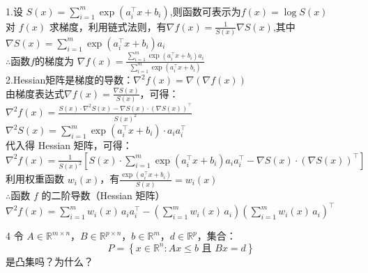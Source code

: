 \documentclass{article}
\newenvironment{problem_cn}[2][问题]{\begin{trivlist}
\item[\hskip \labelsep {\bfseries #1}\hskip \labelsep {\bfseries #2.}]}{\end{trivlist}}
\newenvironment{solution_cn}{%
  \begin{proof}[解答]%
  \kaishu  %
}{%
  \end{proof}%
}
\begin{document}
\begin{solution_cn}
\quad \\
1.设 $S(x) = \sum_{i=1}^m \exp\left(a_i^\top x + b_i\right)$,则函数可表示为$f(x) = \log S(x)$ \\
对 \( f(x) \) 求梯度，利用链式法则，有$\nabla f(x) = \frac{1}{S(x)} \nabla S(x)$,其中 $\nabla S(x) = \sum_{i=1}^m \exp\left(a_i^\top x + b_i\right) a_i $ \\
$\therefore$函数\( f \)的梯度为 $\nabla f(x) = \frac{\sum_{i=1}^m \exp\left(a_i^\top x + b_i\right) a_i}{\sum_{i=1}^m \exp\left(a_i^\top x + b_i\right)}$ \\
2.Hessian矩阵是梯度的导数：$\nabla^2 f(x) = \nabla \left( \nabla f(x) \right)$\\
由梯度表达式$\nabla f(x) = \frac{\nabla S(x)}{S(x)}$，可得：$\nabla^2 f(x) = \frac{S(x) \cdot \nabla^2 S(x) - \nabla S(x) \cdot \left( \nabla S(x) \right)^\top}{S(x)^2}$\\
$\nabla^2 S(x) = \sum_{i=1}^m \exp\left( a_i^\top x + b_i \right) \cdot a_i a_i^\top$ \\
代入得 Hessian 矩阵，可得：$ \nabla^2 f(x) = \frac{1}{S(x)^2} \left[ S(x) \cdot \sum_{i=1}^m \exp\left( a_i^\top x + b_i \right) a_i a_i^\top - \nabla S(x) \cdot \left( \nabla S(x) \right)^\top \right]$\\
利用权重函数 \( w_i(x) \)，有$\frac{\exp\left(a_i^\top x + b_i\right)}{S(x)} = w_i(x)$\\
$\therefore$函数 \( f \) 的二阶导数（Hessian 矩阵）$\nabla^2 f(x) = \sum_{i=1}^m w_i(x) \, a_i a_i^\top - \left( \sum_{i=1}^m w_i(x) \, a_i \right) \left( \sum_{i=1}^m w_i(x) \, a_i \right)^\top$

\end{solution_cn}
\vspace{0.25in}
\begin{problem_cn}{4}
令 \( A \in \mathbb{R}^{m \times n} \)，\( B \in \mathbb{R}^{p \times n} \)，\( b \in \mathbb{R}^m \)，\( d \in \mathbb{R}^p \)，集合：  
$$ P = \left\{ x \in \mathbb{R}^n : Ax \leq b \text{ 且 } Bx = d \right\} $$  
是凸集吗？为什么？
\end{problem_cn}
\end{document}
